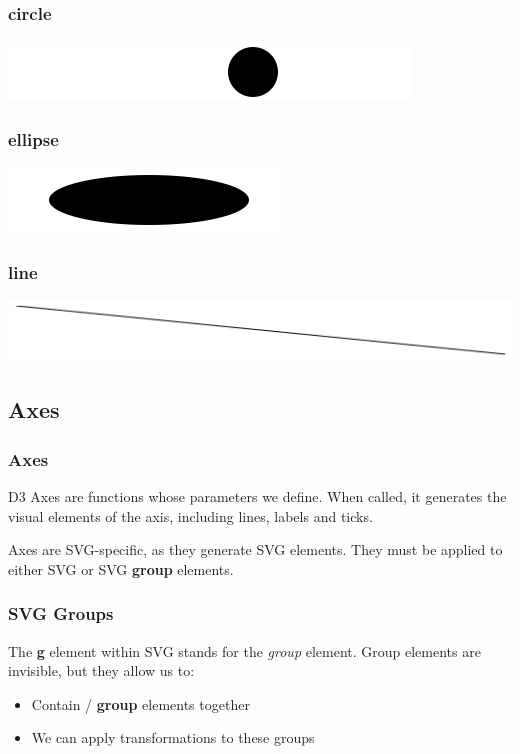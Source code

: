 \documentclass[red]{beamer}
\begin{document}
\begin{frame}
  \frametitle{circle}
  \lstcircle
  \includegraphics[width=\textwidth]{img/circle.png}
\end{frame}

\begin{frame}
  \frametitle{ellipse}
  \lstellipse
  \includegraphics[width=\textwidth]{img/ellipse.png}
\end{frame}

\begin{frame}
  \frametitle{line}
  \lstline
  \includegraphics[width=\textwidth]{img/line.png}
\end{frame}

\subsection{Axes}

\begin{frame}
  \frametitle{Axes}
  D3 Axes are functions whose parameters we define. When called, it generates the visual elements of the axis, including lines, labels and ticks. 
  \newline

  Axes are SVG-specific, as they generate SVG elements. They must be applied to either SVG or SVG \textbf{group} elements. 
\end{frame}

\begin{frame}
  \frametitle{SVG Groups}
  The \textbf{g} element within SVG stands for the \textit{group} element. Group elements are invisible, but they allow us to:
  \begin{itemize}
  \item<1-> Contain / \textbf{group} elements together
  \item<2-> We can apply transformations to these groups
  \end{itemize}
\end{frame}
\end{document}
